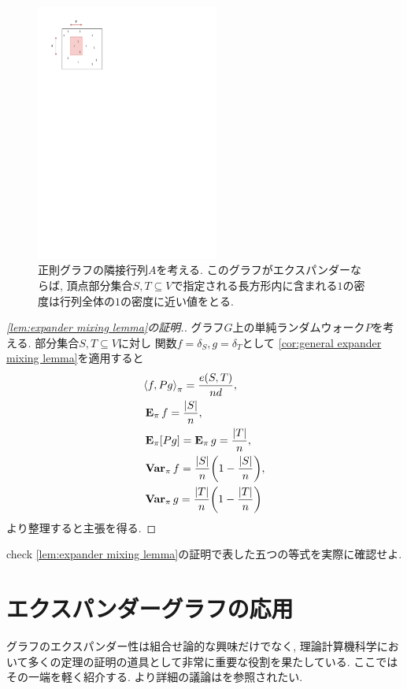 \begin{figure}[htbp]
    \begin{center}
        \includegraphics[width=6cm]{images/EML.pdf}
        \caption{正則グラフの隣接行列$A$を考える. このグラフがエクスパンダーならば, 頂点部分集合$S,T\subseteq V$で指定される長方形内に含まれる$1$の密度は行列全体の$1$の密度に近い値をとる. \label{fig:EML}}
    \end{center}
\end{figure}
%
\begin{proof}[\cref{lem:expander mixing lemma}の証明.]
    グラフ$G$上の単純ランダムウォーク$P$を考える.
    部分集合$S,T\subseteq V$に対し
    関数$f=\delta_S,g=\delta_T$として
    \cref{cor:general expander mixing lemma}を適用すると
    \begin{align*}
         & \piprod{f,Pg} = \frac{e(S,T)}{nd},               \\
         & \Epi f = \frac{|S|}{n},                          \\
         & \Epi [Pg] = \Epi g = \frac{|T|}{n},              \\
         & \Varpi f = \frac{|S|}{n}\rbra*{1-\frac{|S|}{n}}, \\
         & \Varpi g = \frac{|T|}{n}\rbra*{1-\frac{|T|}{n}}
    \end{align*}
    より整理すると主張を得る.
\end{proof}

\begin{exercise}{}{check}
    \cref{lem:expander mixing lemma}の証明で表した五つの等式を実際に確認せよ.
\end{exercise}


\section{エクスパンダーグラフの応用} \label{sec:expander graph application}
グラフのエクスパンダー性は組合せ論的な興味だけでなく,
理論計算機科学において多くの定理の証明の道具として非常に重要な役割を果たしている.
ここではその一端を軽く紹介する.
より詳細の議論は\cite{HLW06}を参照されたい.
%
